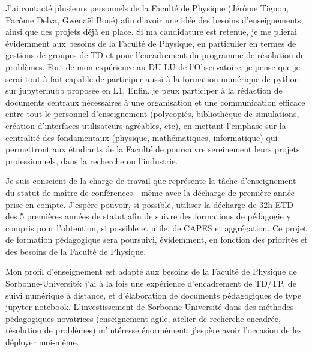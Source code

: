 \pg
J'ai contact\'e plusieurs personnels de la Facult\'e de Physique (J\'er\^ome Tignon, Pac\^ome Delva, Gwena\"el Bou\'e) afin d'avoir une id\'ee des besoins d'enseignements, ainsi que des projets d\'ej\`a en place. Si ma candidature est retenue, je me plierai \'evidemment aux besoins de la Facult\'e de Physique, en particulier en termes de gestions de groupes de TD et pour l'encadrement du programme de r\'esolution de probl\`emes. Fort de mon exp\'erience au DU-LU de l'Observatoire, je pense que je serai tout \`a fait capable de participer aussi \`a la formation num\'erique de python sur jupyterhubb propos\'ee en L1. Enfin, je peux participer \`a la r\'edaction de documents centraux n\'ecessaires \`a une organisation et une communication efficace entre tout le personnel d'enseignement (polycopi\'es, biblioth\`eque de simulations, cr\'eation d'interfaces utilisateurs agr\'eables, etc), en mettant l'emphase sur la centralit\'e des fondamentaux (physique, math\'ematiques, informatique) qui permettront aux \'etudiants de la Facult\'e de poursuivre sereinement leurs projets professionnels, dans la recherche ou l'industrie.

\pg
Je suis conscient de la charge de travail que repr\'esente la t\^ache d'enseignement du statut de ma\^itre de conf\'erences - m\^eme avec la d\'echarge de premi\`ere ann\'ee prise en compte. J'esp\`ere pouvoir, si possible, utiliser la d\'echarge de 32h ETD des 5 premi\`eres ann\'ees de statut afin de suivre des formations de p\'edagogie y compris pour l'obtention, si possible et utile, de CAPES et aggr\'egation. Ce projet de formation p\'edagogique sera poursuivi, \'evidemment, en fonction des priorit\'es et des besoins de la Facult\'e de Physique.

\begin{tcolorbox}[colback=green!10, colframe=green!50!black, arc=3mm, boxrule=1pt]
	Mon profil d'enseignement est adapt\'e aux besoins de la Facult\'e de Physique de Sorbonne-Universit\'e: j'ai \`a la fois une exp\'erience d'encadrement de TD/TP, de suivi num\'erique \`a distance, et d'\'elaboration de documents p\'edagogiques de type jupyter notebook. L'investissement de Sorbonne-Universit\'e dans des m\'ethodes p\'edagogiques novatrices (enseignement agile, atelier de recherche encadr\'ee, r\'esolution de probl\`emes) m'int\'eresse \'enorm\'ement: j'esp\`ere avoir l'occasion de les d\'eployer moi-m\^eme.
\end{tcolorbox}







